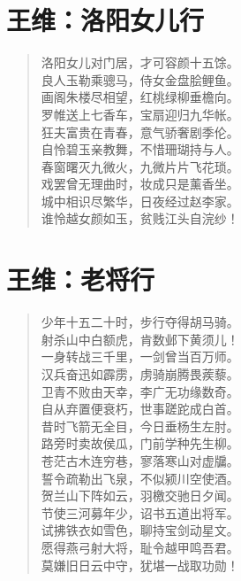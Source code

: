 \documentclass[12pt,oneside]{book}
\newenvironment{shici}{%
\begin{verse}\centering\yanti\large\hspace{12pt}}{\end{verse}}
\begin{document}
\begin{common-format}
\chapter{王维：洛阳女儿行}
\begin{shici}
洛阳女儿对门居，才可容颜十五馀。\\
良人玉勒乘骢马，侍女金盘脍鲤鱼。\\
画阁朱楼尽相望，红桃绿柳垂檐向。\\
罗帷送上七香车，宝扇迎归九华帐。\\
狂夫富贵在青春，意气骄奢剧季伦。\\
自怜碧玉亲教舞，不惜珊瑚持与人。\\
春窗曙灭九微火，九微片片飞花琐。\\
戏罢曾无理曲时，妆成只是薰香坐。\\
城中相识尽繁华，日夜经过赵李家。\\
谁怜越女颜如玉，贫贱江头自浣纱！
\end{shici}

\chapter{王维：老将行}
\begin{shici}
少年十五二十时，步行夺得胡马骑。\\
射杀山中白额虎，肯数邺下黄须儿！\\
一身转战三千里，一剑曾当百万师。\\
汉兵奋迅如霹雳，虏骑崩腾畏蒺藜。\\
卫青不败由天幸，李广无功缘数奇。\\
自从弃置便衰朽，世事蹉跎成白首。\\
昔时飞箭无全目，今日垂杨生左肘。\\
路旁时卖故侯瓜，门前学种先生柳。\\
苍茫古木连穷巷，寥落寒山对虚牖。\\
誓令疏勒出飞泉，不似颍川空使酒。\\
贺兰山下阵如云，羽檄交驰日夕闻。\\
节使三河募年少，诏书五道出将军。\\
试拂铁衣如雪色，聊持宝剑动星文。\\
愿得燕弓射大将，耻令越甲鸣吾君。\\
莫嫌旧日云中守，犹堪一战取功勋！
\end{shici}


\end{common-format}
\end{document}
